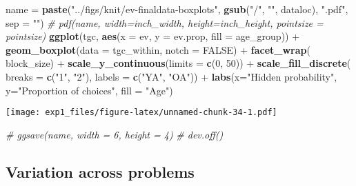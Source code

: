 \documentclass[11pt,,]{article}
\newenvironment{Shaded}{\begin{snugshade}}{\end{snugshade}}
\newcommand{\KeywordTok}[1]{\textcolor[rgb]{0.13,0.29,0.53}{\textbf{{#1}}}}
\newcommand{\DataTypeTok}[1]{\textcolor[rgb]{0.13,0.29,0.53}{{#1}}}
\newcommand{\DecValTok}[1]{\textcolor[rgb]{0.00,0.00,0.81}{{#1}}}
\newcommand{\StringTok}[1]{\textcolor[rgb]{0.31,0.60,0.02}{{#1}}}
\newcommand{\CommentTok}[1]{\textcolor[rgb]{0.56,0.35,0.01}{\textit{{#1}}}}
\newcommand{\OtherTok}[1]{\textcolor[rgb]{0.56,0.35,0.01}{{#1}}}
\newcommand{\NormalTok}[1]{{#1}}
\begin{document}
\begin{Shaded}
\begin{Highlighting}[]
\NormalTok{name =}\StringTok{ }\KeywordTok{paste}\NormalTok{(}\StringTok{"../figs/knit/ev-finaldata-boxplots"}\NormalTok{, }
             \KeywordTok{gsub}\NormalTok{(}\StringTok{"/"}\NormalTok{, }\StringTok{""}\NormalTok{, dataloc), }\StringTok{".pdf"}\NormalTok{, }\DataTypeTok{sep =} \StringTok{""}\NormalTok{)}
\CommentTok{# pdf(name, width=inch_width, height=inch_height, pointsize = pointsize)}
\KeywordTok{ggplot}\NormalTok{(tgc, }\KeywordTok{aes}\NormalTok{(}\DataTypeTok{x =} \NormalTok{ev, }\DataTypeTok{y =} \NormalTok{ev.prop, }\DataTypeTok{fill =} \NormalTok{age_group)) +}\StringTok{ }
\StringTok{  }\KeywordTok{geom_boxplot}\NormalTok{(}\DataTypeTok{data =} \NormalTok{tgc_within, }\DataTypeTok{notch =} \OtherTok{FALSE}\NormalTok{) +}\StringTok{ }
\StringTok{  }\KeywordTok{facet_wrap}\NormalTok{(~}\StringTok{ }\NormalTok{block_size) +}\StringTok{ }
\StringTok{  }\KeywordTok{scale_y_continuous}\NormalTok{(}\DataTypeTok{limits =} \KeywordTok{c}\NormalTok{(}\DecValTok{0}\NormalTok{, }\DecValTok{50}\NormalTok{)) +}\StringTok{ }
\StringTok{  }\KeywordTok{scale_fill_discrete}\NormalTok{(}
    \DataTypeTok{breaks =} \KeywordTok{c}\NormalTok{(}\StringTok{"1"}\NormalTok{, }\StringTok{"2"}\NormalTok{),}
    \DataTypeTok{labels =} \KeywordTok{c}\NormalTok{(}\StringTok{"YA"}\NormalTok{, }\StringTok{"OA"}\NormalTok{)) +}\StringTok{ }
\StringTok{  }\KeywordTok{labs}\NormalTok{(}\DataTypeTok{x=}\StringTok{"Hidden probability"}\NormalTok{, }\DataTypeTok{y=}\StringTok{"Proportion of choices"}\NormalTok{, }\DataTypeTok{fill =} \StringTok{"Age"}\NormalTok{)}
\end{Highlighting}
\end{Shaded}

\texttt{[image: exp1\_files/figure-latex/unnamed-chunk-34-1.pdf]}

\begin{Shaded}
\begin{Highlighting}[]
\CommentTok{# ggsave(name, width = 6, height = 4)}
\CommentTok{# dev.off()}
\end{Highlighting}
\end{Shaded}

\newpage

\newpage

\subsection{Variation across problems}\label{variation-across-problems}
\end{document}
